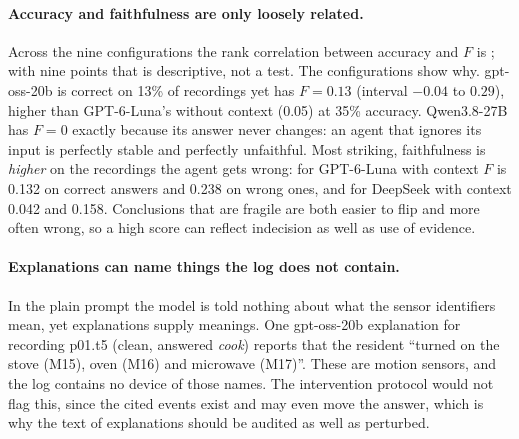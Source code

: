 \documentclass[11pt,a4paper]{article}
\begin{document}
\paragraph{Accuracy and faithfulness are only loosely related.} Across the nine configurations the rank correlation between accuracy and $F$ is \SpearmanAccF; with nine points that is descriptive, not a test. The configurations show why. gpt-oss-20b is correct on 13\% of recordings yet has $F=0.13$ (interval $-0.04$ to $0.29$), higher than GPT-6-Luna's without context (0.05) at 35\% accuracy. Qwen3.8-27B has $F=0$ exactly because its answer never changes: an agent that ignores its input is perfectly stable and perfectly unfaithful. Most striking, faithfulness is \emph{higher} on the recordings the agent gets wrong: for GPT-6-Luna with context $F$ is 0.132 on correct answers and 0.238 on wrong ones, and for DeepSeek with context 0.042 and 0.158. Conclusions that are fragile are both easier to flip and more often wrong, so a high score can reflect indecision as well as use of evidence.

\paragraph{Explanations can name things the log does not contain.} In the plain prompt the model is told nothing about what the sensor identifiers mean, yet explanations supply meanings. One gpt-oss-20b explanation for recording p01.t5 (clean, answered \emph{cook}) reports that the resident ``turned on the stove (M15), oven (M16) and microwave (M17)''. These are motion sensors, and the log contains no device of those names. The intervention protocol would not flag this, since the cited events exist and may even move the answer, which is why the text of explanations should be audited as well as perturbed.
\end{document}
